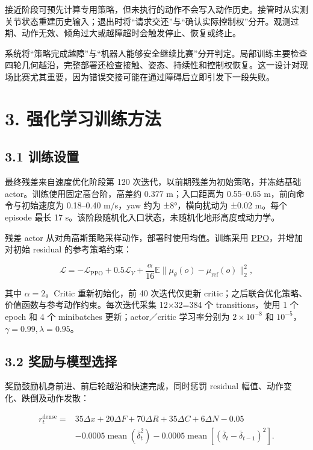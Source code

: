 \documentclass[
  11pt,
  a4paper,
]{article}
\begin{document}
接近阶段可预先计算专用策略，但未执行的动作不会写入动作历史。接管时从实测关节状态重建历史输入；退出时将``请求交还''与``确认实际控制权''分开。观测过期、动作无效、倾角过大或越障超时会触发停止、恢复或终止。

系统将``策略完成越障''与``机器人能够安全继续比赛''分开判定。局部训练主要检查四轮几何越沿，完整部署还检查接触、姿态、持续性和控制权恢复。这一设计对现场比赛尤其重要，因为错误交接可能在通过障碍后立即引发下一段失败。

\clearpage

\section{3.
强化学习训练方法}\label{ux5f3aux5316ux5b66ux4e60ux8badux7ec3ux65b9ux6cd5}

\subsection{3.1 训练设置}\label{ux8badux7ec3ux8bbeux7f6e}

最终残差来自速度优化阶段第 120 次迭代，以前期残差为初始策略，并冻结基础
actor。训练使用固定高台阶，高差约 0.377 m；入口距离为 0.55--0.65
m，前向命令与初始速度为 0.18--0.40 m/s，yaw 约为 ±8°，横向扰动为 ±0.02
m。每个 episode 最长 17
s。该阶段随机化入口状态，未随机化地形高度或动力学。

残差 actor 从对角高斯策略采样动作，部署时使用均值。训练采用
\href{https://arxiv.org/abs/1707.06347}{PPO}，并增加对初始 residual
的参考策略约束：

\[
\mathcal L=-\mathcal L_{\mathrm{PPO}}+0.5\mathcal L_V
+\frac{\alpha}{16}\mathbb E\|\mu_\theta(o)-\mu_{\mathrm{ref}}(o)\|_2^2,
\]

其中 \(\alpha=2\)。Critic 重新初始化，前 40 次迭代仅更新
critic；之后联合优化策略、价值函数与参考动作约束。每次迭代采集 12×32=384
个 transitions，使用 1 个 epoch 和 4 个 minibatches 更新；actor／critic
学习率分别为 \(2\times10^{-8}\) 和
\(10^{-5}\)，\(\gamma=0.99,\lambda=0.95\)。

\subsection{3.2
奖励与模型选择}\label{ux5956ux52b1ux4e0eux6a21ux578bux9009ux62e9}

奖励鼓励机身前进、前后轮越沿和快速完成，同时惩罚 residual
幅值、动作变化、跌倒及动作发散：

\[
\begin{aligned}
r_t^{\mathrm{dense}}={}&35\Delta x+20\Delta F+70\Delta R+35\Delta C+6\Delta N-0.05\\
&-0.0005\operatorname{mean}(\bar\delta_t^2)
-0.0005\operatorname{mean}[(\bar\delta_t-\bar\delta_{t-1})^2].
\end{aligned}
\]
\end{document}
